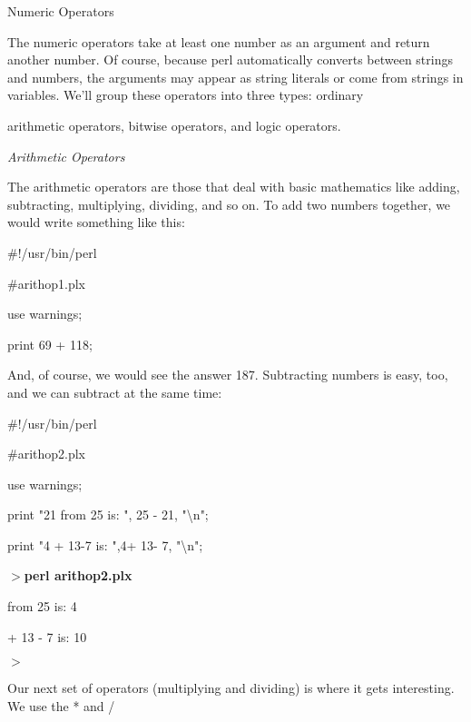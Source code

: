 \documentclass[a4paper,11pt]{book}
\begin{document}
\noindent 

\noindent Numeric Operators

\noindent 

\noindent The numeric operators take at least one number as an argument and return another number. Of course, because perl automatically converts between strings and numbers, the arguments may appear as string literals or come from strings in variables. We'll group these operators into three types: ordinary

\noindent arithmetic operators, bitwise operators, and logic operators.

\noindent 

\noindent \textit{Arithmetic Operators}

\noindent The arithmetic operators are those that deal with basic mathematics like adding, subtracting, multiplying, dividing, and so on. To add two numbers together, we would write something like this:

\noindent 

\noindent 

\noindent \#!/usr/bin/perl

\noindent \#arithop1.plx

\noindent use warnings;

\noindent print 69 + 118;

\noindent 

\noindent And, of course, we would see the answer 187. Subtracting numbers is easy, too, and we can subtract at the same time:

\noindent 

\noindent 

\noindent \#!/usr/bin/perl

\noindent \#arithop2.plx

\noindent use warnings;

\noindent print "21 from 25 is: ", 25 - 21, "\textbackslash n";

\noindent print "4 + 13-7 is: ",4+ 13- 7, "\textbackslash n";

\noindent 

\noindent $>$\textbf{perl arithop2.plx}

 from 25 is: 4

 + 13 - 7 is: 10

\noindent $>$

\noindent 

\noindent Our next set of operators (multiplying and dividing) is where it gets interesting. We use the * and /
\end{document}
